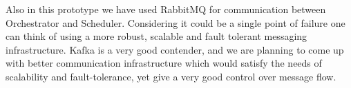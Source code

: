 \documentclass[sigconf]{acmart}
\begin{document}
Also in this prototype we have used RabbitMQ for communication between Orchestrator and Scheduler. Considering it could be a single point of failure one can think of using a more robust, scalable and fault tolerant messaging infrastructure. Kafka is a very good contender, and we are planning to come up with better communication infrastructure which would satisfy the needs of scalability and fault-tolerance, yet give a very good control over message flow.   

%
%


 
\end{document}
